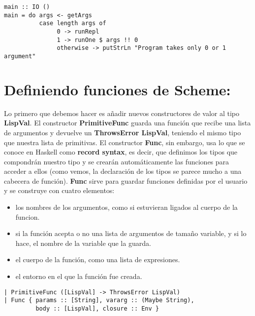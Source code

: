 \begin{minipage}{\linewidth}
\begin{scriptsize}
\begin{lstlisting}[frame=single]
main :: IO ()
main = do args <- getArgs
          case length args of
               0 -> runRepl
               1 -> runOne $ args !! 0
               otherwise -> putStrLn "Program takes only 0 or 1 argument"
\end{lstlisting}
\end{scriptsize}
\end{minipage}

\section{Definiendo funciones de Scheme:}
\label{3:sec7}

Lo primero que debemos hacer es a\~{n}adir nuevos constructores de valor al tipo \textbf{LispVal}. El constructor \textbf{PrimitiveFunc} guarda una funci\'on que recibe una lista de argumentos y devuelve un \textbf{ThrowsError LispVal}, teniendo el mismo tipo que nuestra lista de primitivas. El constructor \textbf{Func}, sin embargo, usa lo que se conoce en Haskell como \textbf{record syntax}, es decir, que definimos los tipos que compondr\'an nuestro tipo y se crear\'an autom\'aticamente las funciones para acceder a ellos (como vemos, la declaraci\'on de los tipos se parece mucho a una cabecera de funci\'on). \textbf{Func} sirve para guardar funciones definidas por el usuario y se construye con cuatro elementos:

\begin{itemize}
  \item los nombres de los argumentos, como si estuvieran ligados al cuerpo de la funcion.
  \item si la funci\'on acepta o no una lista de argumentos de tama\~{n}o variable, y si lo hace, el nombre de la variable que la guarda.
  \item el cuerpo de la funci\'on, como una lista de expresiones.
  \item el entorno en el que la funci\'on fue creada.
\end{itemize}

\begin{minipage}{\linewidth}
\begin{scriptsize}
\begin{lstlisting}[frame=single]
| PrimitiveFunc ([LispVal] -> ThrowsError LispVal)
| Func { params :: [String], vararg :: (Maybe String),
         body :: [LispVal], closure :: Env }
\end{lstlisting}
\end{scriptsize}
\end{minipage}

